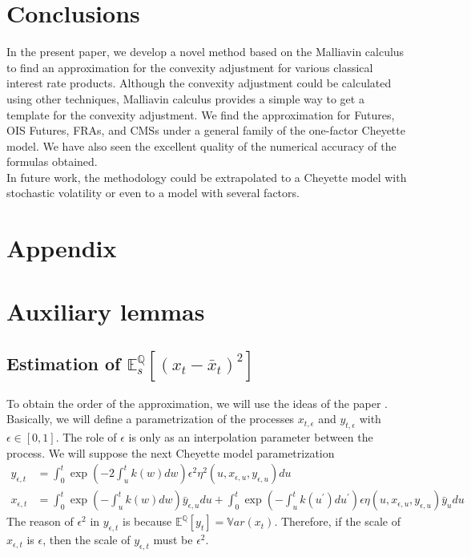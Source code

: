 \documentclass[a4paper,10pt]{article}
\newcommand{\1}{\mathbf{1}}
\begin{document}
\section{Conclusions}\label{sec:Conclusion}
In the present paper, we develop a novel method based on the Malliavin calculus to find an approximation for the convexity adjustment for various classical interest rate products. Although the convexity adjustment could be calculated using other techniques, Malliavin calculus provides a simple way to get a template for the convexity adjustment. We find the approximation for Futures, OIS Futures, FRAs, and CMSs under a general family of the one-factor Cheyette model. We have also seen the excellent quality of the numerical accuracy of the formulas obtained.\\

In future work, the methodology could be extrapolated to a Cheyette model with stochastic volatility or even to a model with several factors.


\section*{Appendix}
\appendix
\renewcommand{\thesection}{\Alph{section}.\arabic{section}}




\section{Auxiliary lemmas}
\subsection{Estimation of $\mathbb{E}_s^{\mathbb{Q}}\left[(x_t - \bar{x}_{t})^{2}\right]$}\label{estimation_error_l2}
To obtain the order of the approximation, we will use the ideas of the paper \cite{BGM}. Basically, we will define a parametrization of the processes $x_{t,\epsilon}$ and $y_{t,\epsilon}$ with $\epsilon \in [0,1]$. The role of $\epsilon$ is only as an interpolation parameter between the process. We will suppose the next Cheyette model parametrization
\begin{align}\label{parametric_process}
y_{\epsilon,t} &= \int_{0}^{t} \exp\left(-2 \int_{u}^{t} k(w) dw\right) \epsilon^{2} \eta^{2}(u,x_{\epsilon,u},y_{\epsilon,u}) du \\
x_{\epsilon, t} &= \int_{0}^{t} \exp\left(-\int_{u}^{t} k(w) dw\right) \bar{y}_{\epsilon,u} du + \int_{0}^{t} \exp\left(-\int_{u}^{t} k(u^{\prime}) du^{\prime}\right) \epsilon \eta(u,x_{\epsilon,u},y_{\epsilon,u})  \bar{y}_u du
\end{align}
The reason of $\epsilon^{2}$ in $y_{\epsilon,t}$ is because $\mathbb{E}^{\mathbb{Q}}\left[y_t\right]= \mathbb{V}ar(x_t)$. Therefore, if the scale of $x_{\epsilon,t}$ is $\epsilon$, then the scale of $y_{\epsilon,t}$ must be $\epsilon^{2}$.\\
\end{document}

